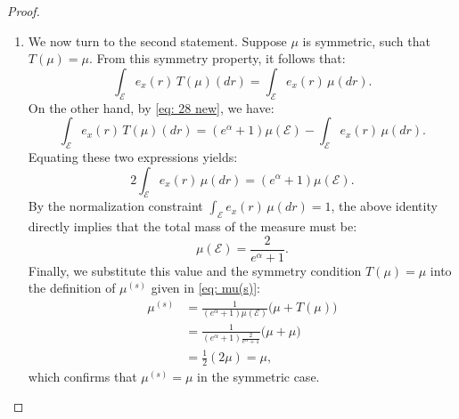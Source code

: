 \documentclass[a4paper, 11pt]{article}
\theoremstyle{definition}
\begin{document}
{\begin{proof}
\begin{enumerate}
    \item {We now turn to the second statement. Suppose $\mu$ is symmetric, such that $T(\mu) = \mu$. From this symmetry property, it follows that:
\begin{equation*}
\int_\mathcal{E} e_x(r) \, T(\mu)(dr) = \int_\mathcal{E} e_x(r) \, \mu(dr).
\end{equation*}
On the other hand, by \eqref{eq: 28 new}, we have:
\begin{equation*}
\int_\mathcal{E} e_x(r) \, T(\mu)(dr) = (e^\alpha + 1) \mu(\mathcal{E}) - \int_\mathcal{E} e_x(r) \, \mu(dr).
\end{equation*}
Equating these two expressions yields:
\begin{equation*}
2 \int_\mathcal{E} e_x(r) \, \mu(dr) = (e^\alpha + 1) \mu(\mathcal{E}).
\end{equation*}
By the normalization constraint $\int_\mathcal{E} e_x(r) \, \mu(dr) = 1$, the above identity directly implies that the total mass of the measure must be:
\begin{equation*}
\mu(\mathcal{E}) = \frac{2}{e^\alpha + 1}.
\end{equation*}
Finally, we substitute this value and the symmetry condition $T(\mu) = \mu$ into the definition of $\mu^{(s)}$ given in \eqref{eq: mu(s)}:
\begin{align*}
\mu^{(s)} &= \frac{1}{(e^\alpha + 1)\mu(\mathcal{E})} \big( \mu + T(\mu) \big) \\
&= \frac{1}{(e^\alpha + 1) \frac{2}{e^\alpha + 1}} \big( \mu + \mu \big) \\
&= \frac{1}{2} (2\mu) = \mu,
\end{align*}
which confirms that $\mu^{(s)} = \mu$ in the symmetric case.}
\end{enumerate}
\end{proof}

}
\end{document}
